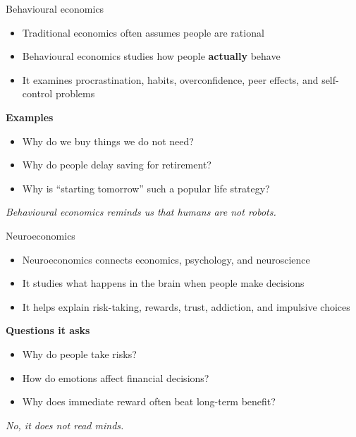 \documentclass[aspectratio=169,11pt]{beamer}
\begin{document}
\begin{frame}{ Behavioural economics}
\begin{itemize}
    \item Traditional economics often assumes people are rational
    \item Behavioural economics studies how people \textbf{actually} behave
    \item It examines procrastination, habits, overconfidence, peer effects, and self-control problems
\end{itemize}
\vspace{0.3cm}
\textbf{Examples}
\begin{itemize}
    \item Why do we buy things we do not need?
    \item Why do people delay saving for retirement?
    \item Why is ``starting tomorrow'' such a popular life strategy?
\end{itemize}
\vspace{0.3cm}
\textit{Behavioural economics reminds us that humans are not robots. }
\end{frame}

\begin{frame}{ Neuroeconomics}
\begin{itemize}
    \item Neuroeconomics connects economics, psychology, and neuroscience
    \item It studies what happens in the brain when people make decisions
    \item It helps explain risk-taking, rewards, trust, addiction, and impulsive choices
\end{itemize}
\vspace{0.4cm}
\textbf{Questions it asks}
\begin{itemize}
    \item Why do people take risks?
    \item How do emotions affect financial decisions?
    \item Why does immediate reward often beat long-term benefit?
\end{itemize}
\vspace{0.3cm}
\textit{No, it does not read minds.} %
\end{frame}
\end{document}
